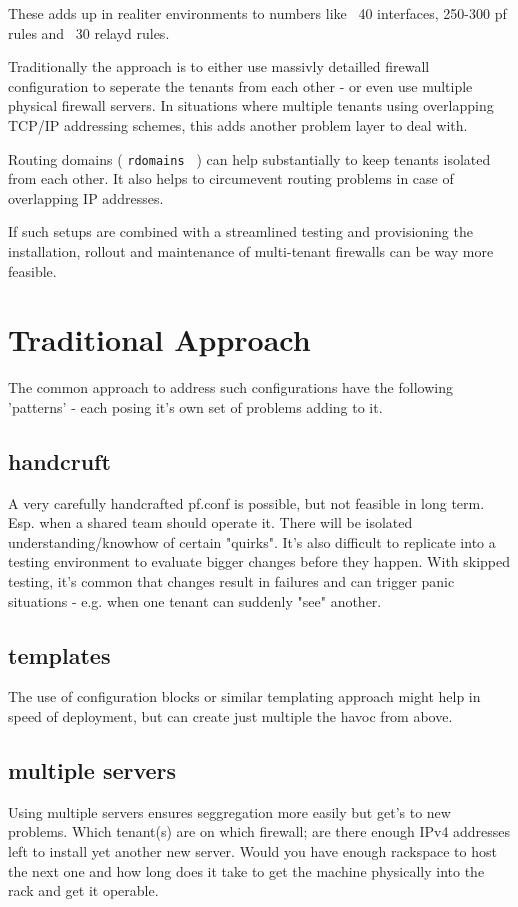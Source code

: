 \documentclass[letterpaper,twocolumn,10pt]{article}
\begin{document}
These adds up in realiter environments to numbers like ~40 interfaces, 250-300 pf rules and ~30 relayd rules.

Traditionally the approach is to either use massivly detailled firewall configuration to seperate the tenants from each other - or even use multiple physical firewall servers. In situations where multiple tenants using overlapping TCP/IP addressing schemes, this adds another problem layer  to deal with.

Routing domains ( {\tt rdomains } ) can help substantially to keep tenants isolated from each other. It also helps to circumevent routing problems in case of overlapping IP addresses.

If such setups are combined with a streamlined testing and provisioning the installation, rollout and maintenance of multi-tenant firewalls can be way more feasible.

\section{Traditional Approach}
The common approach to address such configurations have the following 'patterns' - each posing it's own set of problems adding to it.
\subsection{handcruft}
A very carefully handcrafted pf.conf is possible, but not feasible in long term. Esp. when a shared team should operate it. There will be isolated understanding/knowhow of certain "quirks". It's also difficult to replicate into a testing environment to evaluate bigger changes before they happen. With skipped testing, it's common that changes result in failures and can trigger panic situations - e.g. when one tenant can suddenly "see" another.
\subsection{templates}
The use of configuration blocks or similar templating approach might help in speed of deployment, but can create just multiple the havoc from above.
\subsection{multiple servers}
Using multiple servers ensures seggregation more easily but get's to new problems. Which tenant(s) are on which firewall; are there enough IPv4 addresses left to install yet another new server. Would you have enough rackspace to host the next one and how long does it take to get the machine physically into the rack and get it operable.
\end{document}
